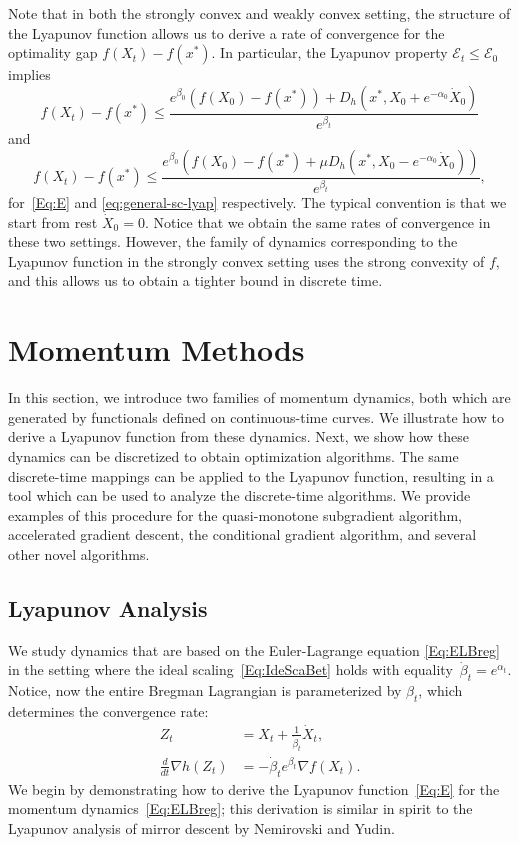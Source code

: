 \documentclass[11pt]{article}
\theoremstyle{plain}
\newcommand{\E}{{\mathcal E}}
\begin{document}
Note that in both the strongly convex and weakly convex setting, the structure of the Lyapunov function allows us to derive a rate of convergence for the optimality gap $f(X_t) - f(x^\ast)$. In particular, the Lyapunov property $\E_t \leq \E_0$ implies 
\begin{equation}\label{eq:Guarantee1}
f(X_t) - f(x^\ast) \leq \frac{e^{\beta_0}(f(X_0) - f(x^\ast)) + D_h(x^\ast, X_0 + e^{-\alpha_0} \dot X_0)}{e^{\beta_t}}
\end{equation}
and 
\begin{equation}
f(X_t) - f(x^\ast) \leq \frac{e^{\beta_0}(f(X_0) - f(x^\ast) +\mu D_h(x^\ast ,X_0 -e^{-\alpha_0} \dot X_0))}{e^{\beta_t}},
\end{equation}
for~\eqref{Eq:E} and \eqref{eq:general-sc-lyap} respectively. The typical convention is that we start from rest $\dot X_0 = 0$. Notice that we obtain the same rates of convergence in these two settings. However, the family of dynamics corresponding to the Lyapunov function in the strongly convex setting uses the strong convexity of $f$, and this allows us to obtain a tighter bound in discrete time.


\section{Momentum Methods}
\label{Sec:MomLyap}
In this section, we introduce two families of momentum dynamics, both which are generated by functionals defined on continuous-time curves. We illustrate how to derive a Lyapunov function from these dynamics. Next, we show how these dynamics can be discretized to obtain optimization algorithms. The same discrete-time mappings can be applied to the Lyapunov function, resulting in a tool which can be used to analyze the discrete-time algorithms. We provide examples of this procedure for the quasi-monotone subgradient algorithm, accelerated gradient descent, the conditional gradient algorithm, and several other novel algorithms. 
 \subsection{Lyapunov Analysis}
We study dynamics that are based on the Euler-Lagrange equation \eqref{Eq:ELBreg} in the setting where the ideal scaling~\eqref{Eq:IdeScaBet} holds with equality~$\dot \beta_t = e^{\alpha_t}$. Notice, now the entire Bregman Lagrangian is parameterized by $\beta_t$, which determines the convergence rate:
 \begin{subequations}\label{Eq:EL}
 \begin{align}
 Z_t &= X_t + \frac{1}{\dot \beta_t} \dot X_t \label{Eq:ELZ},\\
 \frac{d}{dt}\nabla h(Z_t) &= -\dot \beta_t e^{\beta_t} \nabla f(X_t)\label{Eq:ELH}.
 \end{align}
 \end{subequations}
We begin by demonstrating how to derive the Lyapunov function~\eqref{Eq:E} for the momentum dynamics~\eqref{Eq:ELBreg}; this derivation is similar in spirit to the Lyapunov analysis of mirror descent by Nemirovski and Yudin.
  
\end{document}
